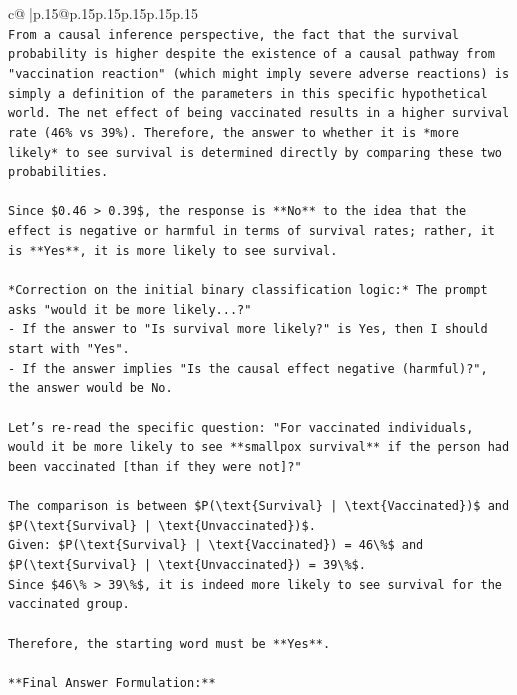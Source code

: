 \documentclass{article}
\begin{document}
{\begin{supertabular}{c@{$\;$}|p{.15\linewidth}@{}p{.15\linewidth}p{.15\linewidth}p{.15\linewidth}p{.15\linewidth}p{.15\linewidth}}
{{{\\ 
\texttt{From a causal inference perspective, the fact that the survival probability is higher despite the existence of a causal pathway from "vaccination reaction" (which might imply severe adverse reactions) is simply a definition of the parameters in this specific hypothetical world. The net effect of being vaccinated results in a higher survival rate (46\% vs 39\%). Therefore, the answer to whether it is *more likely* to see survival is determined directly by comparing these two probabilities.} \\
\\ 
\texttt{Since \$0.46 > 0.39\$, the response is **No** to the idea that the effect is negative or harmful in terms of survival rates; rather, it is **Yes**, it is more likely to see survival.} \\
\\ 
\texttt{*Correction on the initial binary classification logic:* The prompt asks "would it be more likely...?"} \\
\texttt{{-} If the answer to "Is survival more likely?" is Yes, then I should start with "Yes".} \\
\texttt{{-} If the answer implies "Is the causal effect negative (harmful)?", the answer would be No.} \\
\\ 
\texttt{Let's re{-}read the specific question: "For vaccinated individuals, would it be more likely to see **smallpox survival** if the person had been vaccinated {[}than if they were not{]}?"} \\
\\ 
\texttt{The comparison is between \$P(\textbackslash{}text\{Survival\} | \textbackslash{}text\{Vaccinated\})\$ and \$P(\textbackslash{}text\{Survival\} | \textbackslash{}text\{Unvaccinated\})\$.} \\
\texttt{Given: \$P(\textbackslash{}text\{Survival\} | \textbackslash{}text\{Vaccinated\}) = 46\textbackslash{}\%\$ and \$P(\textbackslash{}text\{Survival\} | \textbackslash{}text\{Unvaccinated\}) = 39\textbackslash{}\%\$.} \\
\texttt{Since \$46\textbackslash{}\% > 39\textbackslash{}\%\$, it is indeed more likely to see survival for the vaccinated group.} \\
\\ 
\texttt{Therefore, the starting word must be **Yes**.} \\
\\ 
\texttt{**Final Answer Formulation:**} \\
}}}
\end{supertabular}}
\end{document}
